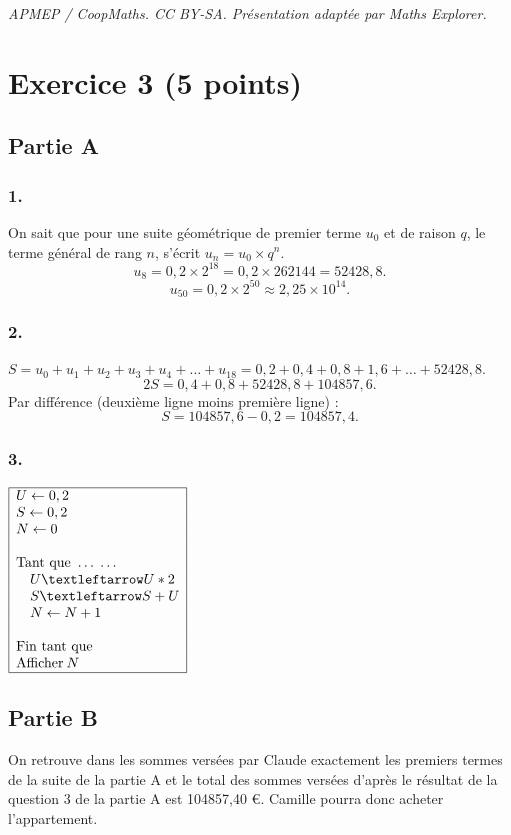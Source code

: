 \documentclass[10pt]{article}
\begin{document}
\noindent\textit{APMEP / CoopMaths. CC BY-SA. Présentation adaptée par Maths Explorer.}\par\medskip
\section*{Exercice 3 (5 points)}
	
	\subsection*{Partie A}
	\subsubsection*{1.}
	On sait que pour une suite géométrique de premier terme $u_0$ et de raison $q$, le terme général de rang $n$, s’écrit $u_n = u_0 \times q^n$.
	\[
	u_8 = 0,2 \times 2^{18} = 0,2 \times 262144 = 52428,8.
	\]
	\[
	u_{50} = 0,2 \times 2^{50} \approx 2,25 \times 10^{14}.
	\]
	
	\subsubsection*{2.}
	$S = u_0 + u_1 + u_2 + u_3 + u_4 + \ldots + u_{18} = 0,2 + 0,4 + 0,8 + 1,6 + \ldots + 52428,8$.
	\[
	2S = 0,4 + 0,8 + 52428,8 + 104857,6.
	\]
	Par différence (deuxième ligne moins première ligne) :
	\[
	S = 104857,6 - 0,2 = 104857,4.
	\]
	
	\subsubsection*{3.}
\begin{center}
	$\begin{array}{|l|}\hline
		U \gets  0,2\\
		S \gets 0,2\\
		N \gets 0\\
		~\\
		\text{Tant que }\ldots\;\ldots\\
		\quad U ← U * 2\\
		\quad S ← S + U\\
		\quad N \gets N + 1\\
		~\\
		\text{Fin tant que}~~~~~~~\\
		\text{Afficher}\: N\\ \hline
	\end{array}$
\end{center}

	
		

	
	\subsection*{Partie B}

	On retrouve dans les sommes versées par Claude exactement les premiers termes de la suite de la partie A et le total des sommes versées d’après le résultat de la question 3 de la partie A est 104857,40 €. Camille pourra donc acheter l’appartement.
\end{document}
